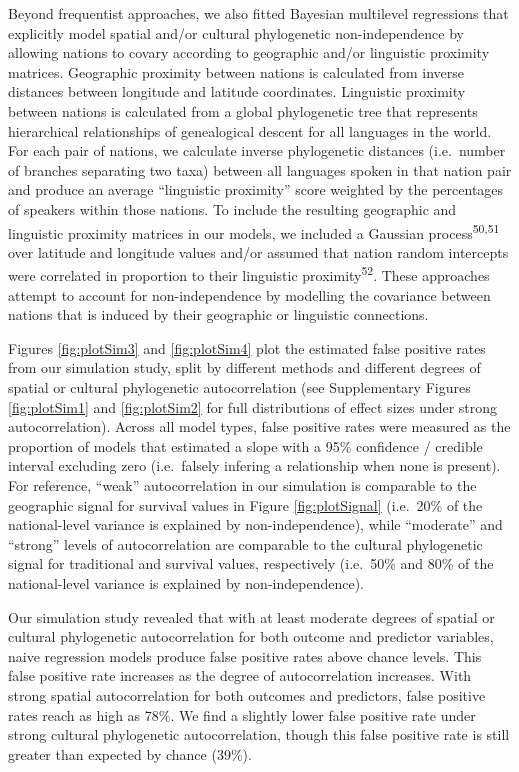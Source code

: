 \documentclass[
  man,floatsintext]{apa6}
\begin{document}
Beyond frequentist approaches, we also fitted Bayesian multilevel regressions that explicitly model spatial and/or cultural phylogenetic non-independence by allowing nations to covary according to geographic and/or linguistic proximity matrices. Geographic proximity between nations is calculated from inverse distances between longitude and latitude coordinates. Linguistic proximity between nations is calculated from a global phylogenetic tree that represents hierarchical relationships of genealogical descent for all languages in the world. For each pair of nations, we calculate inverse phylogenetic distances (i.e.~number of branches separating two taxa) between all languages spoken in that nation pair and produce an average ``linguistic proximity'' score weighted by the percentages of speakers within those nations. To include the resulting geographic and linguistic proximity matrices in our models, we included a Gaussian process\textsuperscript{50,51} over latitude and longitude values and/or assumed that nation random intercepts were correlated in proportion to their linguistic proximity\textsuperscript{52}. These approaches attempt to account for non-independence by modelling the covariance between nations that is induced by their geographic or linguistic connections.

Figures \ref{fig:plotSim3} and \ref{fig:plotSim4} plot the estimated false positive rates from our simulation study, split by different methods and different degrees of spatial or cultural phylogenetic autocorrelation (see Supplementary Figures \ref{fig:plotSim1} and \ref{fig:plotSim2} for full distributions of effect sizes under strong autocorrelation). Across all model types, false positive rates were measured as the proportion of models that estimated a slope with a 95\% confidence / credible interval excluding zero (i.e.~falsely infering a relationship when none is present). For reference, ``weak'' autocorrelation in our simulation is comparable to the geographic signal for survival values in Figure \ref{fig:plotSignal} (i.e.~20\% of the national-level variance is explained by non-independence), while ``moderate'' and ``strong'' levels of autocorrelation are comparable to the cultural phylogenetic signal for traditional and survival values, respectively (i.e.~50\% and 80\% of the national-level variance is explained by non-independence).

Our simulation study revealed that with at least moderate degrees of spatial or cultural phylogenetic autocorrelation for both outcome and predictor variables, naive regression models produce false positive rates above chance levels. This false positive rate increases as the degree of autocorrelation increases. With strong spatial autocorrelation for both outcomes and predictors, false positive rates reach as high as 78\%. We find a slightly lower false positive rate under strong cultural phylogenetic autocorrelation, though this false positive rate is still greater than expected by chance (39\%).
\end{document}
